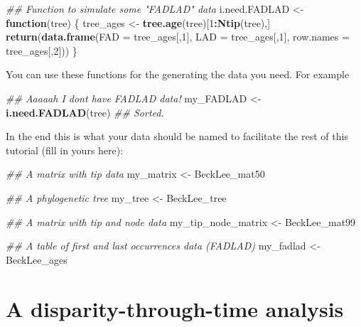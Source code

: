 \documentclass[
]{book}
\newenvironment{Shaded}{\begin{snugshade}}{\end{snugshade}}
\newcommand{\CommentTok}[1]{\textcolor[rgb]{0.56,0.35,0.01}{\textit{#1}}}
\newcommand{\ControlFlowTok}[1]{\textcolor[rgb]{0.13,0.29,0.53}{\textbf{#1}}}
\newcommand{\DataTypeTok}[1]{\textcolor[rgb]{0.13,0.29,0.53}{#1}}
\newcommand{\DecValTok}[1]{\textcolor[rgb]{0.00,0.00,0.81}{#1}}
\newcommand{\KeywordTok}[1]{\textcolor[rgb]{0.13,0.29,0.53}{\textbf{#1}}}
\newcommand{\NormalTok}[1]{#1}
\newcommand{\OperatorTok}[1]{\textcolor[rgb]{0.81,0.36,0.00}{\textbf{#1}}}
\newcommand{\StringTok}[1]{\textcolor[rgb]{0.31,0.60,0.02}{#1}}
\begin{document}
\begin{Shaded}
\begin{Highlighting}[]
\CommentTok{\#\# Function to simulate some "FADLAD" data}
\NormalTok{i.need.FADLAD \textless{}{-}}\StringTok{ }\ControlFlowTok{function}\NormalTok{(tree) \{}
\NormalTok{    tree\_ages \textless{}{-}}\StringTok{ }\KeywordTok{tree.age}\NormalTok{(tree)[}\DecValTok{1}\OperatorTok{:}\KeywordTok{Ntip}\NormalTok{(tree),]}
    \KeywordTok{return}\NormalTok{(}\KeywordTok{data.frame}\NormalTok{(}\DataTypeTok{FAD =}\NormalTok{ tree\_ages[,}\DecValTok{1}\NormalTok{], }\DataTypeTok{LAD =}\NormalTok{ tree\_ages[,}\DecValTok{1}\NormalTok{], }\DataTypeTok{row.names =}\NormalTok{ tree\_ages[,}\DecValTok{2}\NormalTok{]))}
\NormalTok{\}}
\end{Highlighting}
\end{Shaded}

You can use these functions for the generating the data you need. For example

\begin{Shaded}
\begin{Highlighting}[]
\CommentTok{\#\# Aaaaah I don\textquotesingle{}t have FADLAD data!}
\NormalTok{my\_FADLAD \textless{}{-}}\StringTok{ }\KeywordTok{i.need.FADLAD}\NormalTok{(tree)}
\CommentTok{\#\# Sorted.}
\end{Highlighting}
\end{Shaded}

In the end this is what your data should be named to facilitate the rest of this tutorial (fill in yours here):

\begin{Shaded}
\begin{Highlighting}[]
\CommentTok{\#\# A matrix with tip data}
\NormalTok{my\_matrix \textless{}{-}}\StringTok{ }\NormalTok{BeckLee\_mat50}

\CommentTok{\#\# A phylogenetic tree }
\NormalTok{my\_tree \textless{}{-}}\StringTok{ }\NormalTok{BeckLee\_tree}

\CommentTok{\#\# A matrix with tip and node data}
\NormalTok{my\_tip\_node\_matrix \textless{}{-}}\StringTok{ }\NormalTok{BeckLee\_mat99}

\CommentTok{\#\# A table of first and last occurrences data (FADLAD)}
\NormalTok{my\_fadlad \textless{}{-}}\StringTok{ }\NormalTok{BeckLee\_ages}
\end{Highlighting}
\end{Shaded}

\hypertarget{a-disparity-through-time-analysis}{%
\section{A disparity-through-time analysis}\label{a-disparity-through-time-analysis}}
\end{document}
